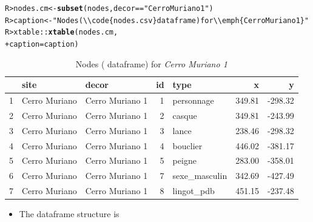 \documentclass[article]{jss}\usepackage[]{graphicx}\usepackage[]{color}
\makeatletter
\newcommand{\hlstr}[1]{\textcolor[rgb]{0.192,0.494,0.8}{#1}}%
\newcommand{\hlopt}[1]{\textcolor[rgb]{0,0,0}{#1}}%
\newcommand{\hlstd}[1]{\textcolor[rgb]{0.345,0.345,0.345}{#1}}%
\newcommand{\hlkwb}[1]{\textcolor[rgb]{0.69,0.353,0.396}{#1}}%
\newcommand{\hlkwc}[1]{\textcolor[rgb]{0.333,0.667,0.333}{#1}}%
\newcommand{\hlkwd}[1]{\textcolor[rgb]{0.737,0.353,0.396}{\textbf{#1}}}%
\newenvironment{kframe}{%
 \def\at@end@of@kframe{}%
 \ifinner\ifhmode%
  \def\at@end@of@kframe{\end{minipage}}%
  \begin{minipage}{\columnwidth}%
 \fi\fi%
 \def\FrameCommand##1{\hskip\@totalleftmargin \hskip-\fboxsep
 \colorbox{shadecolor}{##1}\hskip-\fboxsep
     \hskip-\linewidth \hskip-\@totalleftmargin \hskip\columnwidth}%
 \MakeFramed {\advance\hsize-\width
   \@totalleftmargin\z@ \linewidth\hsize
   \@setminipage}}%
 {\par\unskip\endMakeFramed%
 \at@end@of@kframe}
\makeatother
\begin{document}
\begin{kframe}
\begin{alltt}
\hlstd{R> }\hlstd{nodes.cm} \hlkwb{<-} \hlkwd{subset}\hlstd{(nodes, decor} \hlopt{==} \hlstr{"Cerro Muriano 1"}\hlstd{)}
\hlstd{R> }\hlstd{caption} \hlkwb{<-} \hlstr{"Nodes (\textbackslash{}\textbackslash{}code\{nodes.csv\} dataframe) for \textbackslash{}\textbackslash{}emph\{Cerro Muriano 1\}"}
\hlstd{R> }\hlstd{xtable}\hlopt{::}\hlkwd{xtable}\hlstd{(nodes.cm,}
\hlstd{+ }       \hlkwc{caption} \hlstd{= caption)}
\end{alltt}
\end{kframe}%
\begin{table}[ht]
\centering
\begin{tabular}{rllrlrr}
  \hline
 & site & decor & id & type & x & y \\ 
  \hline
1 & Cerro Muriano & Cerro Muriano 1 &   1 & personnage & 349.81 & -298.32 \\ 
  2 & Cerro Muriano & Cerro Muriano 1 &   2 & casque & 349.81 & -243.99 \\ 
  3 & Cerro Muriano & Cerro Muriano 1 &   3 & lance & 238.46 & -298.32 \\ 
  4 & Cerro Muriano & Cerro Muriano 1 &   4 & bouclier & 446.02 & -381.17 \\ 
  5 & Cerro Muriano & Cerro Muriano 1 &   5 & peigne & 283.00 & -358.01 \\ 
  6 & Cerro Muriano & Cerro Muriano 1 &   7 & sexe\_masculin & 342.69 & -427.49 \\ 
  7 & Cerro Muriano & Cerro Muriano 1 &   8 & lingot\_pdb & 451.15 & -237.48 \\ 
   \hline
\end{tabular}
\caption{Nodes ( dataframe) for \emph{Cerro Muriano 1}} 
\end{table}


\begin{itemize}
\item The  dataframe structure is
\end{itemize}
\end{document}
